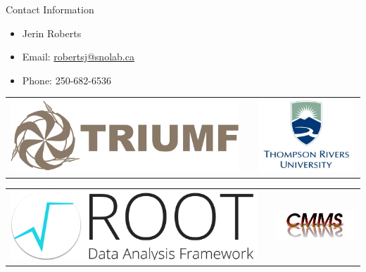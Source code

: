 \documentclass[final]{beamer}
\newlength{\onecolwid}
\begin{document}
\begin{frame}[t]
\begin{columns}[t]
\begin{column}{\onecolwid}


\begin{alertblock}{Contact Information}

\begin{itemize}
\item Jerin Roberts
\item Email: \href{mailto:john@smith.com}{robertsj@snolab.ca}
\item Phone: 250-682-6536


\end{itemize}



\end{alertblock}

\begin{center}
\begin{tabular}{ccc}
\includegraphics[width=0.5\linewidth]{tri} & \hfill & \includegraphics[width=0.2\linewidth]{tru}

\end{tabular}
\end{center}
\begin{center}
\begin{tabular}{ccc}
\includegraphics[width=0.4\linewidth]{root}& \hfill & \includegraphics[width=0.4\linewidth]{cmms}


\end{tabular}
\end{center}
\end{column}
\end{columns}
\end{frame}
\end{document}
